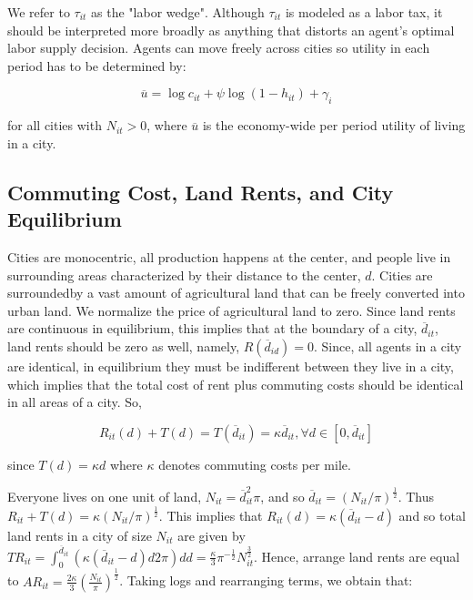 We refer to $\tau_{it}$ as the "labor wedge". Although $\tau_{it}$ is modeled as a labor tax, it should be interpreted more broadly as anything that distorts an agent's optimal labor supply decision. Agents can move freely across cities so utility in each period has to be determined by:

\begin{equation}
    \overline{u} = \log c_{it} + \psi \log(1 - h_{it}) + \gamma_i
\end{equation}

for all cities with $N_{it} > 0$, where $\overline{u}$ is the economy-wide per period utility of living in a city.

\subsection{Commuting Cost, Land Rents, and City Equilibrium}

Cities are monocentric, all production happens at the center, and people live in surrounding areas characterized by their distance to the center, $d$. Cities are surroundedby a vast amount of agricultural land that can be freely converted into urban land. We normalize the price of agricultural land to zero. Since land rents are continuous in equilibrium, this implies that at the boundary of a city, $\overline{d}_{it}$, land rents should be zero as well, namely, $R(\overline{d}_{id}) = 0$. Since, all agents in a city are identical, in equilibrium they must be indifferent between they live in a city, which implies that the total cost of rent plus commuting costs should be identical in all areas of a city. So,

\begin{equation*}
    R_{it}(d) + T(d) = T(\overline{d}_{it}) = \kappa \overline{d}_{it}, \forall d \in [0, \overline{d}_{it}]
\end{equation*}

since $T(d) = \kappa d$ where $\kappa$ denotes commuting costs per mile.

Everyone lives on one unit of land, $N_{it} = \overline{d}_{it}^2 \pi$, and so $\overline{d}_{it} = (N_{it} / \pi)^{\frac{1}{2}}$. Thus $R_{it} + T(d) = \kappa (N_{it} / \pi)^{\frac{1}{2}}$. This implies that $R_{it}(d) = \kappa(\overline{d}_{it} - d)$ and so total land rents in a city of size $N_{it}$ are given by $TR_{it} = \int_0^{\overline{d}_{it}} (\kappa (\overline{d}_{it} - d) d2\pi)dd = \frac{\kappa}{3} \pi^{-\frac{1}{2}} N_{it}^{\frac{3}{2}}$. Hence, arrange land rents are equal to $AR_{it} = \frac{2\kappa}{3} (\frac{N_{it}}{\pi})^{\frac{1}{2}}$. Taking logs and rearranging terms, we obtain that:

